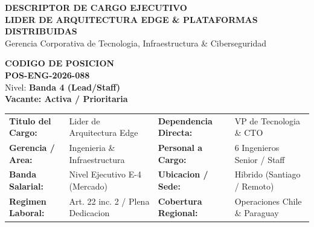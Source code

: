 \documentclass[11pt,a4paper]{article}
\begin{document}

\drawchromaticbar[3.5pt]
\vspace{2.5mm}

\noindent
\begin{minipage}[t]{0.65\textwidth}
  {\fontsize{16}{20}\selectfont\bfseries\color{corpPrimary}DESCRIPTOR DE CARGO EJECUTIVO}\\[2pt]
  {\small\bfseries\color{corpTextAccent}LIDER DE ARQUITECTURA EDGE \& PLATAFORMAS DISTRIBUIDAS}\\[3pt]
  {\footnotesize\color{corpTextMuted}Gerencia Corporativa de Tecnologia, Infraestructura \& Ciberseguridad}
\end{minipage}\hfill
\begin{minipage}[t]{0.32\textwidth}
  \raggedleft
  \begin{tcolorbox}[
    enhanced,
    colback=corpLightBg,
    colframe=corpBorder,
    arc=2mm,
    boxrule=0.7pt,
    top=2mm, bottom=2mm, left=3mm, right=3mm
  ]
    \raggedleft
    {\scriptsize\bfseries\color{corpTextMuted}CODIGO DE POSICION}\\[1pt]
    {\normalsize\bfseries\color{corpPrimary}POS-ENG-2026-088}\\[2pt]
    {\scriptsize\color{corpTextDark}Nivel: \textbf{Banda 4 (Lead/Staff)}}\\[1pt]
    {\scriptsize\color{corpSuccess}\textbf{Vacante: Activa / Prioritaria}}
  \end{tcolorbox}
\end{minipage}

\vspace{2mm}

\noindent
\begin{tcolorbox}[
  enhanced,
  colback=white,
  colframe=corpBorder,
  title={\small\bfseries\color{corpPrimary}FICHA GENERAL DE LA POSICION},
  colbacktitle=corpLightBg,
  arc=1.5mm,
  boxrule=0.6pt,
  top=2.5mm, bottom=2.5mm, left=3.5mm, right=3.5mm
]
  \noindent
  \begin{tabularx}{\linewidth}{@{} l X l X @{}}
    {\footnotesize\bfseries Titulo del Cargo:} & {\footnotesize Lider de Arquitectura Edge} &
    {\footnotesize\bfseries Dependencia Directa:} & {\footnotesize VP de Tecnologia \& CTO} \\
    {\footnotesize\bfseries Gerencia / Area:} & {\footnotesize Ingenieria \& Infraestructura} &
    {\footnotesize\bfseries Personal a Cargo:} & {\footnotesize 6 Ingenieros Senior / Staff} \\
    {\footnotesize\bfseries Banda Salarial:} & {\footnotesize Nivel Ejecutivo E-4 (Mercado)} &
    {\footnotesize\bfseries Ubicacion / Sede:} & {\footnotesize Hibrido (Santiago / Remoto)} \\
    {\footnotesize\bfseries Regimen Laboral:} & {\footnotesize Art. 22 inc. 2 / Plena Dedicacion} &
    {\footnotesize\bfseries Cobertura Regional:} & {\footnotesize Operaciones Chile \& Paraguay} \\
  \end{tabularx}
\end{tcolorbox}
\end{document}
